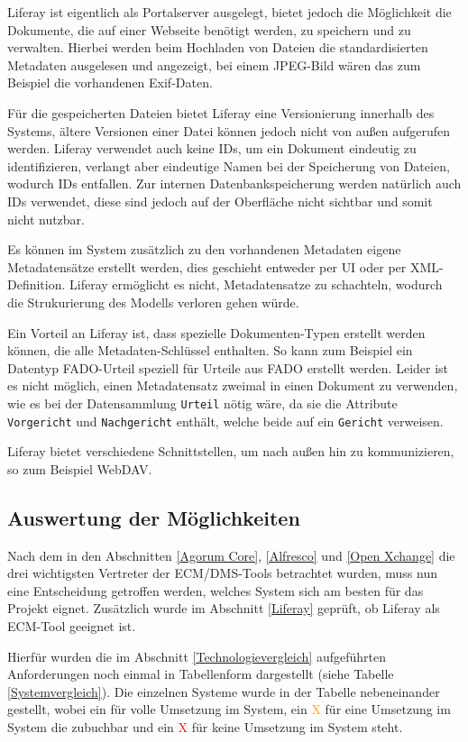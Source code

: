 Liferay ist eigentlich als Portalserver ausgelegt, bietet jedoch die M\"oglichkeit die Dokumente, die auf einer Webseite ben\"otigt werden, zu speichern und zu verwalten. Hierbei werden beim Hochladen von Dateien die standardisierten Metadaten ausgelesen und angezeigt, bei einem JPEG-Bild w\"aren das zum Beispiel die vorhandenen \ac{Exif}-Daten.

F\"ur die gespeicherten Dateien bietet Liferay eine Versionierung innerhalb des Systems, \"altere Versionen einer Datei k\"onnen jedoch nicht von au\ss{}en aufgerufen werden. Liferay verwendet auch keine IDs, um ein Dokument eindeutig zu identifizieren, verlangt aber eindeutige Namen bei der Speicherung von Dateien, wodurch IDs entfallen. Zur internen Datenbankspeicherung werden nat\"urlich auch IDs verwendet, diese sind jedoch auf der Oberfl\"ache nicht sichtbar und somit nicht nutzbar.

Es k\"onnen im System zus\"atzlich zu den vorhandenen Metadaten eigene Metadatens\"atze erstellt werden, dies geschieht entweder per \ac{UI} oder per XML-Definition.
Liferay erm\"oglicht es nicht, Metadatensatze zu schachteln, wodurch die Strukurierung des Modells verloren gehen w\"urde.

Ein Vorteil an Liferay ist, dass spezielle Dokumenten-Typen erstellt werden k\"onnen, die alle Metadaten-Schl\"ussel enthalten. So kann zum Beispiel ein Datentyp \ac{FADO}-Urteil speziell f\"ur Urteile aus \ac{FADO} erstellt werden. Leider ist es nicht m\"oglich, einen Metadatensatz zweimal in einen Dokument zu verwenden, wie es bei der Datensammlung \texttt{Urteil} n\"otig w\"are, da sie die Attribute \texttt{Vorgericht} und \texttt{Nachgericht} enth\"alt, welche beide auf ein \texttt{Gericht} verweisen.

Liferay bietet verschiedene Schnittstellen, um nach au\ss{}en hin zu kommunizieren, so zum Beispiel WebDAV.

\subsection{Auswertung der M\"oglichkeiten}\label{Auswertung ECM}
Nach dem in den Abschnitten \ref{Agorum Core}, \ref{Alfresco} und \ref{Open Xchange} die drei wichtigsten Vertreter der \ac{ECM}/\ac{DMS}-Tools
betrachtet wurden, muss nun eine Entscheidung getroffen werden, welches System sich am besten f\"ur das Projekt eignet. Zus\"atzlich wurde im Abschnitt \ref{Liferay} gepr\"uft, ob Liferay als ECM-Tool geeignet ist.

Hierf\"ur wurden die im Abschnitt \ref{Technologievergleich} aufgef\"uhrten Anforderungen noch einmal in Tabellenform dargestellt (siehe Tabelle \ref{Systemvergleich}). Die einzelnen Systeme wurde in der Tabelle nebeneinander gestellt, wobei ein \textcolor{green}{\checkmark} f\"ur volle Umsetzung im System, ein \textcolor{orange}{\checkmark X} f\"ur eine Umsetzung im System die zubuchbar und ein \textcolor{red}{X} f\"ur keine Umsetzung im System steht.


